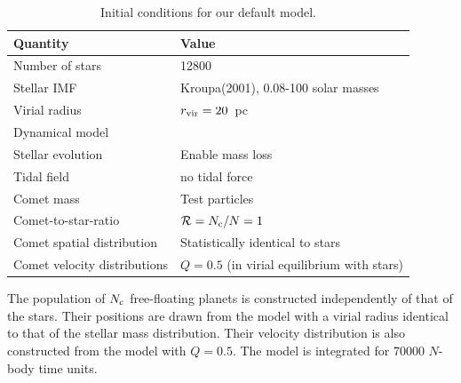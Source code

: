 \documentclass[usenatbib]{mnras}
\newcommand{\ncomets}{N_{\rm c}}
\newcommand{\ratio}{\mathcal{R}}
\newcommand{\rvir}{r_{\rm vir}}
\newcommand{\qc}{Q_{\rm c}}
\newcommand{\qe}{Q_{\rm e}}
\newcommand{\qh}{Q_{\rm h}}
\begin{document}
\begin{table}
\caption{Initial conditions for our default model.  \label{table:initial}}
\begin{tabular}{ll}
\hline
\hline
Quantity & Value \\
\hline
Number of stars &  12800 \\
Stellar IMF &  Kroupa(2001), 0.08-100 solar masses\\ %
Virial radius & $\rvir=20$~pc \\ %
Dynamical model & \cite{Plummer:1911aa} \\
Stellar evolution &  Enable mass loss \\ %
Tidal field & no tidal force\\ %
\hline
Comet mass & Test particles \\
Comet-to-star-ratio & $\ratio=\ncomets/N= 1$ \\
Comet spatial distribution & Statistically identical to stars \\
Comet velocity distributions & $Q=0.5$ (in virial equilibrium with stars) \\
\hline
\hline
\end{tabular}
\end{table}






The population of $\ncomets$ free-floating planets is constructed independently of that of the stars. Their positions are drawn from the \cite{Plummer:1911aa} model with a virial radius identical to that of the stellar mass distribution. Their velocity distribution is also constructed from the \cite{Plummer:1911aa} model with $Q=0.5$. The model is integrated for 70000 $N$-body time units.%


\end{document}
